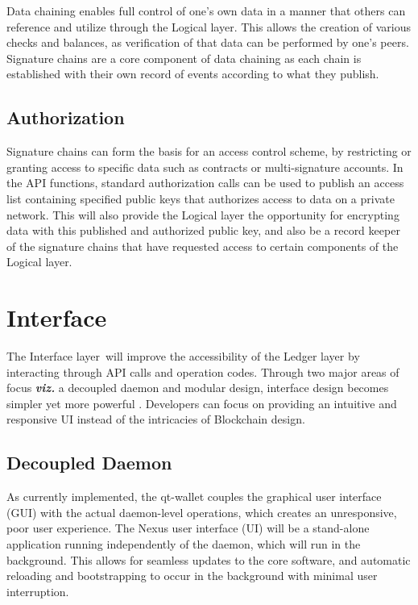 \documentclass[11pt]{article}
\begin{document}
Data chaining enables full control of one's own data in a manner that others can reference and utilize through the Logical layer. This allows the creation of various checks and balances, as verification of that data can be performed by one's peers.
Signature chains are a core component of data chaining as each chain is established with their own record of events according to what they publish.

\subsection{Authorization}

Signature chains can form the basis for an access control scheme, by restricting or granting access to specific data such as contracts or multi-signature accounts.
In the API functions, standard authorization calls can be used to publish an access list containing specified public keys that authorizes access to data on a private network.
This will also provide the Logical layer the opportunity for encrypting data with this published and authorized public key, and also be a record keeper of the signature chains that have requested access to certain components of the Logical layer.


\section{Interface}

The Interface layer will improve the accessibility of the Ledger layer by interacting through API calls and operation codes.
Through two major areas of focus \textit{\textbf{viz.}} a decoupled daemon and modular design, interface design becomes simpler yet more powerful
.
Developers can focus on providing an intuitive and responsive UI instead of the intricacies of Blockchain design.

\subsection{Decoupled Daemon}

As currently implemented, the qt-wallet couples the graphical user interface (GUI) with the actual daemon-level operations, which creates an unresponsive, poor user experience.
The Nexus user interface (UI) will be a stand-alone application running independently of the daemon, which will run in the background. This allows for seamless updates to the core software, and automatic reloading and bootstrapping to occur in the background with minimal user interruption.
\end{document}
